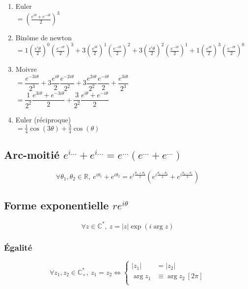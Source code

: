 \documentclass{article}
\newcommand{\R}{{\mathbb R}}
\renewcommand{\C}{{\mathbb C}}
\renewcommand{\cong}{\equiv}
\begin{document}
\begin{enumerate}
	\item Euler \\
		$= \left( \frac{e^{i\theta}+e^{-i\theta}}{2} \right)^3$
	\item Binôme de newton \\
		$= 1\left( \frac{e^i{\theta}}{2} \right)^0\left( \frac{e^{-i\theta}}{2} \right)^3 + 3\left( \frac{e^{i\theta}}{2} \right)^1 \left( \frac{e^{-i\theta}}{2} \right)^2 + 3\left( \frac{e^i{\theta}}{2} \right)^2\left( \frac{e^{-i\theta}}{2} \right)^1 + 1\left( \frac{e^{i\theta}}{2} \right)^3 \left( \frac{e^{-i\theta}}{2} \right)^0$
	\item Moivre \\
		$= \dfrac{e^{-3i\theta}}{2^3} + 3\dfrac{e^{i\theta}}{2}\dfrac{e^{-2i\theta}}{2^2}+ 3\dfrac{e^{2i\theta}}{2^2}\dfrac{e^{-i\theta}}{2} + \dfrac{e^{3i\theta}}{2^3}$ \\
		$= \dfrac{1}{2^2}\dfrac{e^{3i\theta} + e^{-3i\theta}}{2} + \dfrac{3}{2^2}\dfrac{e^{i\theta} + e^{-i\theta}}{2}$
	\item Euler (réciproque) \\
		$= \frac{1}{4}\cos(3\theta) + \frac{3}{4}\cos(\theta)$
\end{enumerate}

\subsection{Arc-moitié $e^{i\ldots} + e^{i\ldots} = e^{\ldots}(e^{\ldots} + e^{\ldots})$}

\[
	\forall \theta_1, \theta_2 \in \R,\ e^{i\theta_1}+e^{i\theta_2} = e^{i\frac{\theta_1+\theta_2}{2}}(e^{i\frac{\theta_1-\theta_2}{2}}+e^{i\frac{\theta_2-\theta_1}{2}})
\] 

\subsection{Forme exponentielle $re^{i\theta}$}
\[
	\forall z\in \C^{\ast},\ z = |z|\exp(i\arg z)
\] 
\subsubsection{Égalité}
\[
	\forall z_1, z_2 \in \C_+^{\ast},\ z_1 = z_2 \iff \begin{cases}
		|z_1| &= |z_2| \\
		\arg z_1 &\cong \arg z_2\ [2\pi] \\
	\end{cases}
\] 
\end{document}
